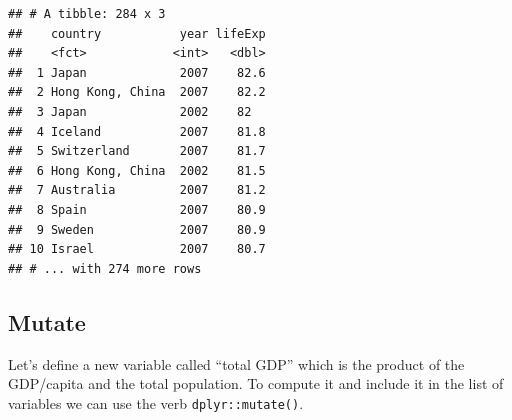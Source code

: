 \documentclass[11pt,]{article}
\newenvironment{Shaded}{\begin{snugshade}}{\end{snugshade}}
\newcommand{\KeywordTok}[1]{\textcolor[rgb]{0.13,0.29,0.53}{\textbf{#1}}}
\newcommand{\DataTypeTok}[1]{\textcolor[rgb]{0.13,0.29,0.53}{#1}}
\newcommand{\DecValTok}[1]{\textcolor[rgb]{0.00,0.00,0.81}{#1}}
\newcommand{\StringTok}[1]{\textcolor[rgb]{0.31,0.60,0.02}{#1}}
\newcommand{\CommentTok}[1]{\textcolor[rgb]{0.56,0.35,0.01}{\textit{#1}}}
\newcommand{\OperatorTok}[1]{\textcolor[rgb]{0.81,0.36,0.00}{\textbf{#1}}}
\newcommand{\NormalTok}[1]{#1}
\begin{document}
\begin{Shaded}
\end{Shaded}

\begin{verbatim}
## # A tibble: 284 x 3
##    country           year lifeExp
##    <fct>            <int>   <dbl>
##  1 Japan             2007    82.6
##  2 Hong Kong, China  2007    82.2
##  3 Japan             2002    82  
##  4 Iceland           2007    81.8
##  5 Switzerland       2007    81.7
##  6 Hong Kong, China  2002    81.5
##  7 Australia         2007    81.2
##  8 Spain             2007    80.9
##  9 Sweden            2007    80.9
## 10 Israel            2007    80.7
## # ... with 274 more rows
\end{verbatim}

\subsection{Mutate}\label{mutate}

Let's define a new variable called ``total GDP'' which is the product of
the GDP/capita and the total population. To compute it and include it in
the list of variables we can use the verb \texttt{dplyr::mutate()}.

\begin{Shaded}
\end{Shaded}
\end{document}
